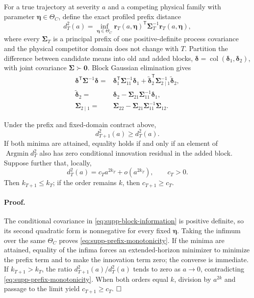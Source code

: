 For a true trajectory at severity $a$ and a competing physical family with
parameter $\bm\eta\in\Theta_C$, define the exact profiled prefix distance
\begin{equation}
 d_T^2(a)=\inf_{\bm\eta\in\Theta_C}
 \bm r_T(a,\bm\eta)^{\mathsf T}\bm\Sigma_T^{-1}
 \bm r_T(a,\bm\eta),
 \label{eq:supp-profiled-prefix-distance}
\end{equation}
where every $\bm\Sigma_T$ is a principal prefix of one positive-definite
process covariance and the physical competitor domain does not change with
$T$. Partition the difference between candidate means into old and added
blocks, $\bm\delta=\operatorname{col}(\bm\delta_1,\bm\delta_2)$, with joint
covariance $\bm\Sigma\succ\bm0$. Block Gaussian elimination gives
\begin{align}
 \bm\delta^{\mathsf T}\bm\Sigma^{-1}\bm\delta
 ={}&\bm\delta_1^{\mathsf T}\bm\Sigma_{11}^{-1}\bm\delta_1
 +\widetilde{\bm\delta}_2^{\mathsf T}
 \bm\Sigma_{2\mid1}^{-1}\widetilde{\bm\delta}_2,
 \label{eq:supp-block-information}\\
 \widetilde{\bm\delta}_2={}&\bm\delta_2-
 \bm\Sigma_{21}\bm\Sigma_{11}^{-1}\bm\delta_1,
 \\
 \bm\Sigma_{2\mid1}={}&\bm\Sigma_{22}-
 \bm\Sigma_{21}\bm\Sigma_{11}^{-1}\bm\Sigma_{12}.
\end{align}

\begin{theorem}
Under the prefix and fixed-domain contract above,
\begin{equation}
 d_{T+1}^2(a)\ge d_T^2(a).
 \label{eq:supp-prefix-monotonicity}
\end{equation}
If both minima are attained, equality holds if and only if an element of
$\operatorname{Argmin}d_T^2$ also has zero conditional innovation residual in
the added block. Suppose further that, locally,
\begin{equation}
 d_T^2(a)=c_Ta^{2k_T}+o(a^{2k_T}),\qquad c_T>0.
 \label{eq:supp-prefix-contact-order}
\end{equation}
Then $k_{T+1}\le k_T$; if the order remains $k$, then
$c_{T+1}\ge c_T$.
\label{thm:supp-prefix-monotonicity}
\end{theorem}

\paragraph{Proof.}
The conditional covariance in \eqref{eq:supp-block-information} is positive
definite, so its second quadratic form is nonnegative for every fixed
$\bm\eta$. Taking the infimum over the same $\Theta_C$ proves
\eqref{eq:supp-prefix-monotonicity}. If the minima are attained, equality of
the infima forces an extended-horizon minimizer to minimize the prefix term and
to make the innovation term zero; the converse is immediate. If
$k_{T+1}>k_T$, the ratio $d_{T+1}^2(a)/d_T^2(a)$ tends to zero as $a\to0$,
contradicting \eqref{eq:supp-prefix-monotonicity}. When both orders equal $k$,
division by $a^{2k}$ and passage to the limit yield
$c_{T+1}\ge c_T$. $\hfill\square$

